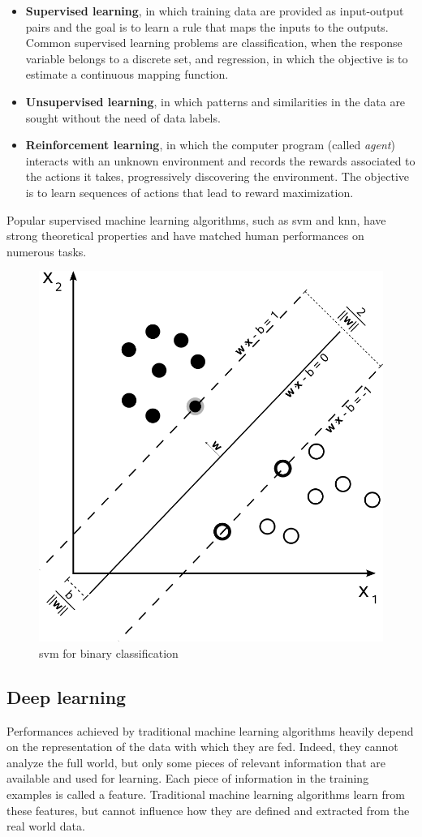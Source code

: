 \documentclass[%
    corpo=12pt,
    twoside,
    stile=classica,   
    tipotesi=magistrale,
    evenboxes,
    english,
	numerazioneromana,
]{toptesi}
\begin{document}
\begin{itemize}
	\item \textbf{Supervised learning}, in which training data are provided as input-output pairs and the goal is to learn a rule that maps the inputs to the outputs. Common supervised learning problems are classification, when the response variable belongs to a discrete set, and regression, in which the objective is to estimate a continuous mapping function.
	\item \textbf{Unsupervised learning}, in which patterns and similarities in the data are sought without the need of data labels.
	\item \textbf{Reinforcement learning}, in which the computer program (called \textit{agent}) interacts with an unknown environment and records the rewards associated to the actions it takes, progressively discovering the environment. The objective is to learn sequences of actions that lead to reward maximization.
\end{itemize}

Popular supervised machine learning algorithms, such as \gls{svm} and \gls{knn}, have strong theoretical properties and have matched human performances on numerous tasks.

\begin{figure}[ht]
	\centering
	\includegraphics[width=.45\linewidth]{imgs/svm.png}
	\caption{\Gls{svm} for binary classification}
	\label{fig:supervised}
\end{figure}

\subsection{Deep learning}
Performances achieved by traditional machine learning algorithms heavily depend on the representation of the data with which they are fed. Indeed, they cannot analyze the full world, but only some pieces of relevant information that are available and used for learning. Each piece of information in the training examples is called a feature. Traditional machine learning algorithms learn from these features, but cannot influence how they are defined and extracted from the real world data.
\end{document}
